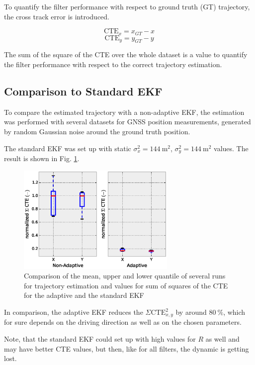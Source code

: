 \documentclass[a4paper,twoside]{article}
\begin{document}
To quantify the filter performance with respect to ground truth (GT) trajectory, the cross track error is introduced.

\begin{equation}\text{CTE}_x=x_{GT}-x\end{equation}
\begin{equation}\text{CTE}_y=y_{GT}-y\end{equation}

The sum of the square of the CTE over the whole dataset is a value to quantify the filter performance with respect to the correct trajectory estimation.

\subsection{Comparison to Standard EKF}

To compare the estimated trajectory with a non-adaptive EKF, the estimation was performed with several datasets for GNSS position measurements, generated by random Gaussian noise around the ground truth position.

The standard EKF was set up with static $\sigma_x^2=\SI{144}{\square\metre}$, $\sigma_y^2=\SI{144}{\square\metre}$ values. The result is shown in Fig.  \ref{Boxplot}.

\begin{figure}[ht]
\centering
\includegraphics[width=3.0in]{images/CTE-Adaptive-NonAdaptive-Boxplot}
\caption{Comparison of the mean, upper and lower quantile of several runs for trajectory estimation and values for sum of squares of the CTE for the adaptive and the standard EKF}
\label{Boxplot}
\end{figure}

In comparison, the adaptive EKF reduces the $\Sigma \text{CTE}_{x,y}^2$ by around $\SI{80}{\percent}$, which for sure depends on the driving direction as well as on the chosen parameters.

Note, that the standard EKF could set up with high values for $R$ as well and may have better CTE values, but then, like for all filters, the dynamic is getting lost.
\end{document}

